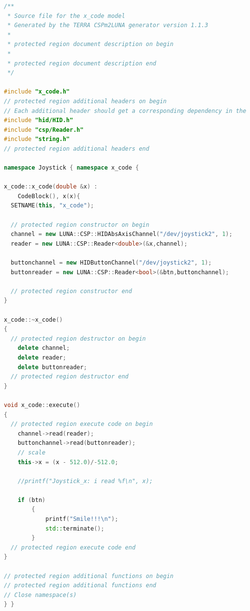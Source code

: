 \documentclass[a4paper,twoside,11pt]{article}
\begin{document}
\newpage 
\begin{lstlisting}[caption=x\_code Joystick C++ code block, label=code:x_code, language=C++]
/**
 * Source file for the x_code model
 * Generated by the TERRA CSPm2LUNA generator version 1.1.3
 *
 * protected region document description on begin
 *
 * protected region document description end
 */

#include "x_code.h"
// protected region additional headers on begin
// Each additional header should get a corresponding dependency in the Makefile
#include "hid/HID.h"
#include "csp/Reader.h"
#include "string.h"
// protected region additional headers end

namespace Joystick { namespace x_code { 

x_code::x_code(double &x) :
    CodeBlock(), x(x){
  SETNAME(this, "x_code");

  // protected region constructor on begin
  channel = new LUNA::CSP::HIDAbsAxisChannel("/dev/joystick2", 1);
  reader = new LUNA::CSP::Reader<double>(&x,channel);

  buttonchannel = new HIDButtonChannel("/dev/joystick2", 1);
  buttonreader = new LUNA::CSP::Reader<bool>(&btn,buttonchannel);

  // protected region constructor end
}

x_code::~x_code()
{
  // protected region destructor on begin
	delete channel;
	delete reader;
	delete buttonreader;
  // protected region destructor end
}

void x_code::execute()
{
  // protected region execute code on begin
	channel->read(reader);
	buttonchannel->read(buttonreader);
	// scale
	this->x = (x - 512.0)/-512.0;

	//printf("Joystick_x: i read %f\n", x);

	if (btn)
		{
			printf("Smile!!!\n");
			std::terminate();
		}
  // protected region execute code end
}

// protected region additional functions on begin
// protected region additional functions end
// Close namespace(s)
} } 
\end{lstlisting}
\end{document}
